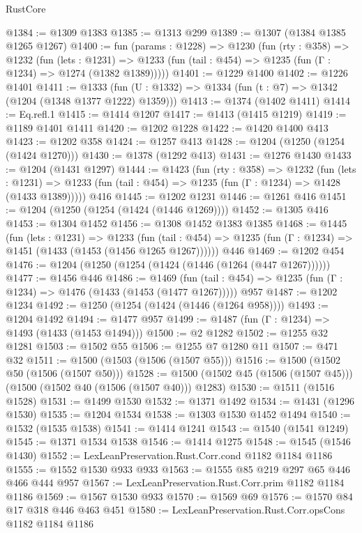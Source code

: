 \begin{lexlean}{RustCore}
\begin{coremodule}
@1384 := @1309 @1383
@1385 := @1313 @299
@1389 := @1307 (@1384 @1385 @1265 @1267)
@1400 := fun (params : @1228) =>
  @1230
    (fun (rty : @358) =>
    @1232
      (fun (lets : @1231) =>
      @1233 (fun (tail : @454) => @1235 (fun (Γ : @1234) => @1274 (@1382 @1389)))))
@1401 := @1229 @1400
@1402 := @1226 @1401
@1411 := @1333 (fun (U : @1332) => @1334 (fun (t : @7) => @1342 (@1204 (@1348 @1377 @1222) @1359)))
@1413 := @1374 (@1402 @1411)
@1414 := Eq.refl.{1}
@1415 := @1414 @1207
@1417 := @1413 (@1415 @1219)
@1419 := @1189 @1401 @1411
@1420 := @1202 @1228
@1422 := @1420 @1400 @413
@1423 := @1202 @358
@1424 := @1257 @413
@1428 := @1204 (@1250 (@1254 (@1424 @1270)))
@1430 := @1378 (@1292 @413)
@1431 := @1276 @1430
@1433 := @1204 (@1431 @1297)
@1444 := @1423
    (fun (rty : @358) =>
    @1232
      (fun (lets : @1231) =>
      @1233 (fun (tail : @454) => @1235 (fun (Γ : @1234) => @1428 (@1433 @1389)))))
    @416
@1445 := @1202 @1231
@1446 := @1261 @416
@1451 := @1204 (@1250 (@1254 (@1424 (@1446 @1269))))
@1452 := @1305 @416
@1453 := @1304 @1452
@1456 := @1308 @1452 @1383 @1385
@1468 := @1445
    (fun (lets : @1231) =>
    @1233
      (fun (tail : @454) => @1235 (fun (Γ : @1234) => @1451 (@1433 (@1453 (@1456 @1265 @1267))))))
    @446
@1469 := @1202 @454
@1476 := @1204 (@1250 (@1254 (@1424 (@1446 (@1264 (@447 @1267))))))
@1477 := @1456 @446
@1486 := @1469
    (fun (tail : @454) => @1235 (fun (Γ : @1234) => @1476 (@1433 (@1453 (@1477 @1267)))))
    @957
@1487 := @1202 @1234
@1492 := @1250 (@1254 (@1424 (@1446 (@1264 @958))))
@1493 := @1204 @1492
@1494 := @1477 @957
@1499 := @1487 (fun (Γ : @1234) => @1493 (@1433 (@1453 @1494)))
@1500 := @2 @1282
@1502 := @1255 @32 @1281
@1503 := @1502 @55
@1506 := @1255 @7 @1280 @11
@1507 := @471 @32
@1511 := @1500 (@1503 (@1506 (@1507 @55)))
@1516 := @1500 (@1502 @50 (@1506 (@1507 @50)))
@1528 := @1500 (@1502 @45 (@1506 (@1507 @45))) (@1500 (@1502 @40 (@1506 (@1507 @40))) @1283)
@1530 := @1511 (@1516 @1528)
@1531 := @1499 @1530
@1532 := @1371 @1492
@1534 := @1431 (@1296 @1530)
@1535 := @1204 @1534
@1538 := @1303 @1530 @1452 @1494
@1540 := @1532 (@1535 @1538)
@1541 := @1414 @1241
@1543 := @1540 (@1541 @1249)
@1545 := @1371 @1534 @1538
@1546 := @1414 @1275
@1548 := @1545 (@1546 @1430)
@1552 := LexLeanPreservation.Rust.Corr.cond @1182 @1184 @1186
@1555 := @1552 @1530 @933 @933
@1563 := @1555 @85 @219 @297 @65 @446 @466 @444 @957
@1567 := LexLeanPreservation.Rust.Corr.prim @1182 @1184 @1186
@1569 := @1567 @1530 @933
@1570 := @1569 @69
@1576 := @1570 @84 @17 @318 @446 @463 @451
@1580 := LexLeanPreservation.Rust.Corr.opsCons @1182 @1184 @1186

\end{coremodule}
\end{lexlean}

